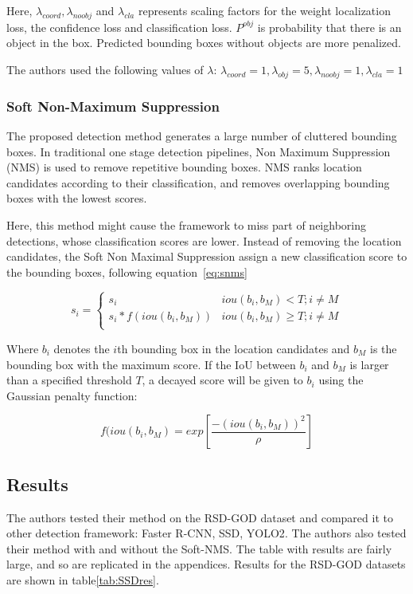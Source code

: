 Here, $\lambda_{coord}, \lambda_{noobj}$ and $\lambda_{cla}$ represents scaling factors for the weight localization loss, the confidence loss and classification loss. $P^{obj}$ is probability that there is an object in the box. Predicted bounding boxes without objects are more penalized. 

The authors used the following values of $\lambda$: $\lambda_{coord} = 1, \lambda_{obj} = 5, \lambda_{noobj} = 1, \lambda_{cla} = 1$
\subsubsection{Soft Non-Maximum Suppression}

The proposed detection method generates a large number of cluttered bounding boxes. In traditional one stage detection pipelines, Non Maximum Suppression (NMS) is used to remove repetitive bounding boxes. NMS ranks location candidates according to their classification, and removes overlapping bounding boxes with the lowest scores. 

Here, this method might cause the framework to miss part of neighboring detections, whose classification scores are lower. Instead of removing the location candidates, the Soft Non Maximal Suppression assign a new classification score to the bounding boxes, following equation~\ref{eq:snms}

\begin{equation}\label{eq:snms}
	s_i =
	      \begin{cases}
		      s_i & iou(b_i, b_M) < T; i \neq M\\
		      s_i * f(iou(b_i, b_M)) & iou(b_i, b_M) \geq T; i \neq M\\
	      \end{cases}  
\end{equation}

Where $b_i$ denotes the $i$th bounding box in the location candidates and $b_M$ is the bounding box with the maximum score. If the IoU between $b_i$ and $b_M$ is larger than a specified threshold $T$, a decayed score will be given to $b_i$ using the Gaussian penalty function:

\begin{equation}
	f(iou(b_i, b_M) = exp[\frac{-(iou(b_i, b_M))^2}{\rho}]
\end{equation}

\subsection{Results}
The authors tested their method on the RSD-GOD dataset and compared it to other detection framework: Faster R-CNN\cite{FasterRCNN}, SSD\cite{ssd}, YOLO2\cite{yolov9000}. The authors also tested their method with and without the Soft-NMS. The table with results are fairly large, and so are replicated in the appendices. Results for the RSD-GOD datasets are shown in table\ref{tab:SSDres}.

